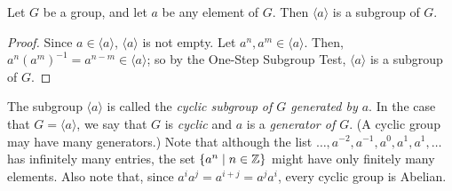 \documentclass[../butidigress.tex]{subfiles}
\begin{document}
\begin{theorem}
Let $G$ be a group, and let $a$ be any element of $G$.
Then $\langle a \rangle$ is a subgroup of $G$.
\end{theorem}

\begin{proof}
Since $a \in \langle a \rangle$, $\langle a \rangle$ is not empty.
Let $a^{n}, a^{m} \in \langle a \rangle$.
Then, $a^{n}(a^{m})^{-1} = a^{n - m} \in \langle a \rangle$; so by the One-Step Subgroup Test, $\langle a \rangle$ is a subgroup of $G$.
\end{proof}

The subgroup $\langle a \rangle$ is called the \emph{cyclic subgroup of $G$ generated by $a$}.
In the case that $G = \langle a \rangle$, we say that $G$ is \emph{cyclic} and $a$ is a \emph{generator of $G$}.
(A cyclic group may have many generators.)
Note that although the list $\ldots,a^{-2},a^{-1},a^{0},a^{1},a^{1},\ldots$ has infinitely many entries, the set $\{ a^{n} \mid n\in\mathbb{Z}\}$ might have only finitely many elements.
Also note that, since $a^{i}a^{j} = a^{i+j} = a^{j}a^{i}$, every cyclic group is Abelian.
\end{document}
